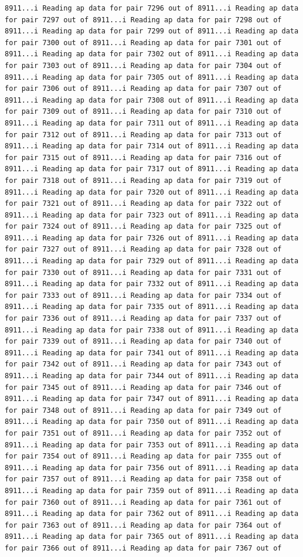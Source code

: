 \documentclass[
]{article}
\begin{document}
\begin{verbatim}
8911...i Reading ap data for pair 7296 out of 8911...i Reading ap data for pair 7297 out of 8911...i Reading ap data for pair 7298 out of 8911...i Reading ap data for pair 7299 out of 8911...i Reading ap data for pair 7300 out of 8911...i Reading ap data for pair 7301 out of 8911...i Reading ap data for pair 7302 out of 8911...i Reading ap data for pair 7303 out of 8911...i Reading ap data for pair 7304 out of 8911...i Reading ap data for pair 7305 out of 8911...i Reading ap data for pair 7306 out of 8911...i Reading ap data for pair 7307 out of 8911...i Reading ap data for pair 7308 out of 8911...i Reading ap data for pair 7309 out of 8911...i Reading ap data for pair 7310 out of 8911...i Reading ap data for pair 7311 out of 8911...i Reading ap data for pair 7312 out of 8911...i Reading ap data for pair 7313 out of 8911...i Reading ap data for pair 7314 out of 8911...i Reading ap data for pair 7315 out of 8911...i Reading ap data for pair 7316 out of 8911...i Reading ap data for pair 7317 out of 8911...i Reading ap data for pair 7318 out of 8911...i Reading ap data for pair 7319 out of 8911...i Reading ap data for pair 7320 out of 8911...i Reading ap data for pair 7321 out of 8911...i Reading ap data for pair 7322 out of 8911...i Reading ap data for pair 7323 out of 8911...i Reading ap data for pair 7324 out of 8911...i Reading ap data for pair 7325 out of 8911...i Reading ap data for pair 7326 out of 8911...i Reading ap data for pair 7327 out of 8911...i Reading ap data for pair 7328 out of 8911...i Reading ap data for pair 7329 out of 8911...i Reading ap data for pair 7330 out of 8911...i Reading ap data for pair 7331 out of 8911...i Reading ap data for pair 7332 out of 8911...i Reading ap data for pair 7333 out of 8911...i Reading ap data for pair 7334 out of 8911...i Reading ap data for pair 7335 out of 8911...i Reading ap data for pair 7336 out of 8911...i Reading ap data for pair 7337 out of 8911...i Reading ap data for pair 7338 out of 8911...i Reading ap data for pair 7339 out of 8911...i Reading ap data for pair 7340 out of 8911...i Reading ap data for pair 7341 out of 8911...i Reading ap data for pair 7342 out of 8911...i Reading ap data for pair 7343 out of 8911...i Reading ap data for pair 7344 out of 8911...i Reading ap data for pair 7345 out of 8911...i Reading ap data for pair 7346 out of 8911...i Reading ap data for pair 7347 out of 8911...i Reading ap data for pair 7348 out of 8911...i Reading ap data for pair 7349 out of 8911...i Reading ap data for pair 7350 out of 8911...i Reading ap data for pair 7351 out of 8911...i Reading ap data for pair 7352 out of 8911...i Reading ap data for pair 7353 out of 8911...i Reading ap data for pair 7354 out of 8911...i Reading ap data for pair 7355 out of 8911...i Reading ap data for pair 7356 out of 8911...i Reading ap data for pair 7357 out of 8911...i Reading ap data for pair 7358 out of 8911...i Reading ap data for pair 7359 out of 8911...i Reading ap data for pair 7360 out of 8911...i Reading ap data for pair 7361 out of 8911...i Reading ap data for pair 7362 out of 8911...i Reading ap data for pair 7363 out of 8911...i Reading ap data for pair 7364 out of 8911...i Reading ap data for pair 7365 out of 8911...i Reading ap data for pair 7366 out of 8911...i Reading ap data for pair 7367 out of 
\end{verbatim}
\end{document}
